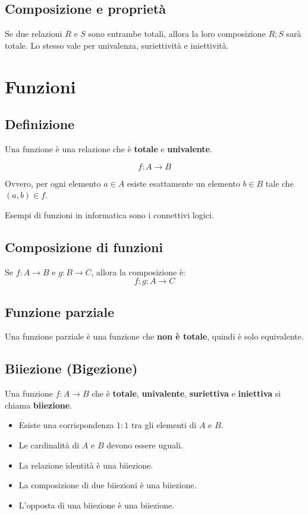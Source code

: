 \documentclass[a4paper,12pt]{article}
\let\oldsection\section
\renewcommand{\section}{\clearpage\oldsection}
\begin{document}
\subsection{Composizione e proprietà}
Se due relazioni $R$ e $S$ sono entrambe totali, allora la loro composizione $R;S$ sarà totale.  
Lo stesso vale per univalenza, suriettività e iniettività.

\section{Funzioni}

\subsection{Definizione}
Una funzione è una relazione che è \textbf{totale} e \textbf{univalente}.  

\[
f: A \to B
\]

Ovvero, per ogni elemento $a \in A$ esiste esattamente un elemento $b \in B$ tale che $(a,b) \in f$.  

Esempi di funzioni in informatica sono i connettivi logici.

\subsection{Composizione di funzioni}
Se $f: A \to B$ e $g: B \to C$, allora la composizione è:
\[
f;g: A \to C
\]

\subsection{Funzione parziale}
Una funzione parziale è una funzione che \textbf{non è totale}, quindi è solo equivalente.

\subsection{Biiezione (Bigezione)}
Una funzione $f: A \to B$ che è \textbf{totale}, \textbf{univalente}, \textbf{suriettiva} e \textbf{iniettiva} si chiama \textbf{biiezione}.  

\begin{itemize}
    \item Esiste una corrispondenza $1:1$ tra gli elementi di $A$ e $B$.
    \item Le cardinalità di $A$ e $B$ devono essere uguali.
    \item La relazione identità è una biiezione.
    \item La composizione di due biiezioni è una biiezione.
    \item L'opposta di una biiezione è una biiezione.
\end{itemize}
\end{document}
